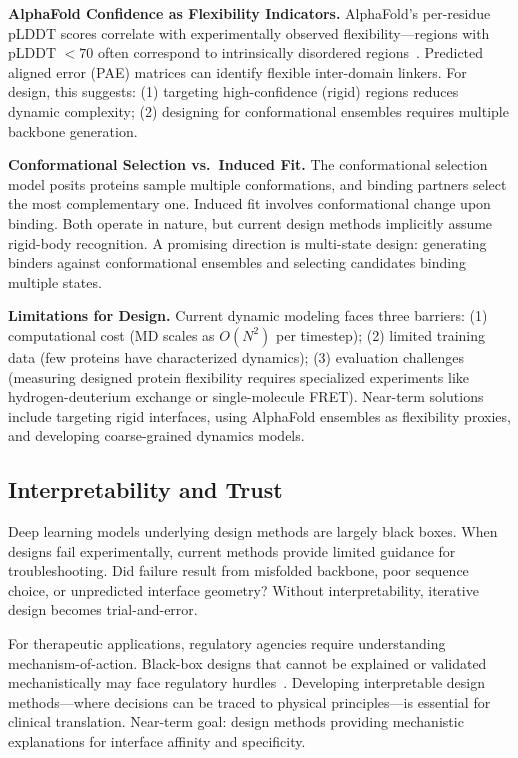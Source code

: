 \textbf{AlphaFold Confidence as Flexibility Indicators.} AlphaFold's per-residue pLDDT scores correlate with experimentally observed flexibility---regions with pLDDT $< 70$ often correspond to intrinsically disordered regions~\cite{tunyasuvunakool2021alphafold}. Predicted aligned error (PAE) matrices can identify flexible inter-domain linkers. For design, this suggests: (1) targeting high-confidence (rigid) regions reduces dynamic complexity; (2) designing for conformational ensembles requires multiple backbone generation.

\textbf{Conformational Selection vs.\ Induced Fit.} The conformational selection model posits proteins sample multiple conformations, and binding partners select the most complementary one. Induced fit involves conformational change upon binding. Both operate in nature, but current design methods implicitly assume rigid-body recognition. A promising direction is multi-state design: generating binders against conformational ensembles and selecting candidates binding multiple states.

\textbf{Limitations for Design.} Current dynamic modeling faces three barriers: (1) computational cost (MD scales as $O(N^2)$ per timestep); (2) limited training data (few proteins have characterized dynamics); (3) evaluation challenges (measuring designed protein flexibility requires specialized experiments like hydrogen-deuterium exchange or single-molecule FRET). Near-term solutions include targeting rigid interfaces, using AlphaFold ensembles as flexibility proxies, and developing coarse-grained dynamics models.

\subsection{Interpretability and Trust}

Deep learning models underlying design methods are largely black boxes. When designs fail experimentally, current methods provide limited guidance for troubleshooting. Did failure result from misfolded backbone, poor sequence choice, or unpredicted interface geometry? Without interpretability, iterative design becomes trial-and-error.

For therapeutic applications, regulatory agencies require understanding mechanism-of-action. Black-box designs that cannot be explained or validated mechanistically may face regulatory hurdles~\cite{raybould2019developability}. Developing interpretable design methods---where decisions can be traced to physical principles---is essential for clinical translation. Near-term goal: design methods providing mechanistic explanations for interface affinity and specificity.

